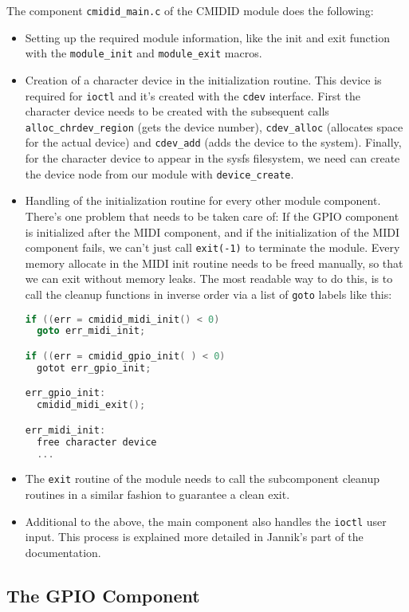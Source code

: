 \documentclass[paper=a4,fontsize=11pt,twocolumn,pagesize,bibtotoc]{scrartcl}
\begin{document}
The component \texttt{cmidid\_main.c} of the CMIDID module does the following:
\begin{itemize}
  \item Setting up the required module information, like the init and exit 
    function with the \texttt{module\_init} and \texttt{module\_exit} macros.
  \item Creation of a character device in the initialization routine. This
    device is required for \texttt{ioctl} and it's created with the \texttt{cdev}
    interface. First the character device needs to be created with the 
    subsequent calls \texttt{alloc\_chrdev\_region} (gets the device number), 
    \texttt{cdev\_alloc} (allocates space for the actual device) and
    \texttt{cdev\_add} (adds the device to the system). Finally, for the character
    device to appear in the sysfs filesystem, we need can create the device 
    node from our module with \texttt{device\_create}.
  \item Handling of the initialization routine for every other module 
    component. There's one problem that needs to be taken care of: If the 
    GPIO component is initialized after the MIDI component, and if the 
    initialization of the MIDI component fails, we can't just call \texttt{exit(-1)}
    to terminate the module. Every memory allocate in the MIDI init routine
    needs to be freed manually, so that we can exit without memory leaks.
    The most readable way to do this, is to call the cleanup functions in 
    inverse order via a list of \texttt{goto} labels like this:
\begin{lstlisting}[language=C]
if ((err = cmidid_midi_init() < 0)
  goto err_midi_init;

if ((err = cmidid_gpio_init( ) < 0)
  gotot err_gpio_init;

err_gpio_init:
  cmidid_midi_exit();

err_midi_init:
  free character device
  ...
\end{lstlisting}
  \item The \texttt{exit} routine of the module needs to call the subcomponent
    cleanup routines in a similar fashion to guarantee a clean exit.
  \item Additional to the above, the main component also handles the \texttt{ioctl}
    user input. This process is explained more detailed in Jannik's part of the 
    documentation.
\end{itemize}


\subsection{The GPIO Component}
\label{component:gpio}
\end{document}
